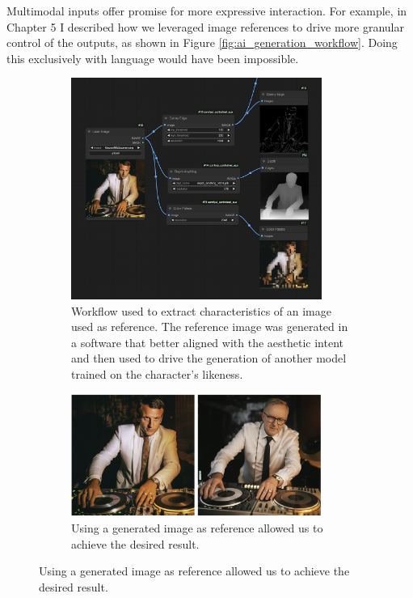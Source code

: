 Multimodal inputs offer promise for more expressive interaction. For example, in Chapter 5 I described how we leveraged image references to drive more granular control of the outputs, as shown in Figure  \ref{fig:ai_generation_workflow}. Doing this exclusively with language would have been impossible. 

\begin{figure}[htbp]
    \centering

    \begin{subfigure}[b]{\textwidth}
        \centering
        \includegraphics[width=0.9\textwidth]{controlnetworkflow.png}
        \caption{Workflow used to extract characteristics of an image used as reference. The reference image was generated in a software that better aligned with the aesthetic intent and then used to drive the generation of another model trained on the character's likeness.}
        \label{fig:controlnetworkflow}
    \end{subfigure}


    \begin{subfigure}[b]{\textwidth}
        \centering
        \includegraphics[width=0.9\textwidth]{inputoutput.png}
        \caption{Using a generated image as reference allowed us to achieve the desired result.}
        \label{fig:inputoutput}
    \end{subfigure}


\end{figure}
